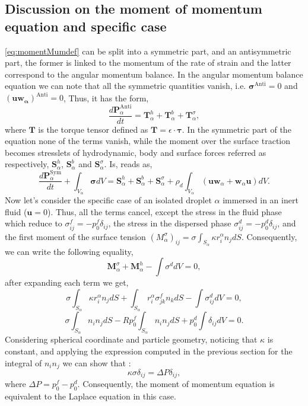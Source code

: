 \subsection{Discussion on the moment of momentum equation and specific case} 
\ref{eq:momentMumdef} can be split into a symmetric part, and an antisymmetric part, the former is linked to the momentum of the rate of strain and the latter correspond to the angular momentum balance.
In the angular momentum balance equation we can note that all the symmetric quantities vanish, i.e. $\bm{\sigma}^{\text{Anti}} = 0$ and $(\bm{uw_\alpha})^{\text{Anti}} =0$, 
Thus, it has the form, 
\begin{equation}
    \frac{d\bm{P}_\alpha^{\text{Anti}}}{dt} 
    = \bm{T}_\alpha^{h}
    + \bm{T}_\alpha^{b}
    + \bm{T}_\alpha^\sigma,
\end{equation} 
where $\bm{T}$ is the torque tensor defined as $\bm{T} = \epsilon\cdot\bm{\tau}$.
In the symmetric part of the equation none of the terms vanish, while the moment over the surface traction becomes stresslets of hydrodynamic, body and surface forces referred as respectively, $\bm{S}_\alpha^h$, $\bm{S}_\alpha^b$ and $\bm{S}_\alpha^\sigma$. 
Is, reads as, 
\begin{equation}
    \frac{d\bm{P}_\alpha^{\text{Sym}}}{dt} 
    + \int_{V_\alpha} \bm{\sigma} dV
    = \bm{S}_\alpha^{h}
    + \bm{S}_\alpha^{b}
    + \bm{S}_\alpha^\sigma
    + \rho_d\int_{V_\alpha} (\bm{u}\bm{w}_\alpha+\bm{w}_\alpha\bm{u}) dV.
\end{equation} 
Now let's consider the specific case of an isolated droplet $\alpha$ immersed in an inert fluid ($\bm{u} = 0$).
Thus, all the terms cancel, except the stress in the fluid phase which reduce to $\sigma_{ij}^f = -p^f_0\delta_{ij}$,
the stress in the dispersed phase $\sigma_{ij}^d = -p^d_0 \delta_{ij}$,
and the first moment of the surface tension $(M^\sigma_\alpha)_{ij} =\sigma \int_{S_\alpha} \kappa r^\alpha_i n_j dS$.
Consequently, we can write the following equality, 
\begin{equation}
    \bm{M}^\sigma_\alpha 
    + \bm{M}^h_\alpha 
    - \int \sigma^d dV
    = 0,
\end{equation}
after expanding each term we get, 
\begin{equation}
    \sigma \int_{S_\alpha} \kappa r^\alpha_i  n_j  dS
    + \int_{S_\alpha}  r_i^\alpha \sigma_{jk}^f n_k dS
    - \int \sigma_{ij}^d dV
    = 0,
\end{equation}
\begin{equation}
    \sigma \int_{S_\alpha} n_i  n_j  dS
    - R p^f_0 \int_{S_\alpha} n_i n_j dS
    + p^d_0 \int\delta_{ij} dV
    = 0.
\end{equation}
Considering spherical coordinate and particle geometry, noticing that $\kappa$ is constant,   
and applying the expression computed in the previous section for the integral of $n_in_j$ we can show that : 
\begin{equation}
    \kappa \sigma \delta_{ij}= \Delta P \delta_{ij},
\end{equation}
where $\Delta P = p^f_0 - p^d_0$. 
Consequently, the moment of momentum equation is equivalent to the Laplace equation in this case. 

